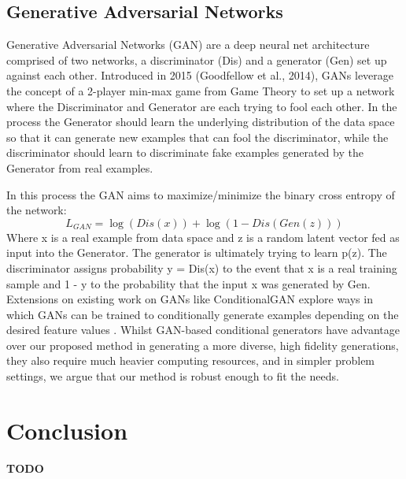 \documentclass{article}
\begin{document}
\subsection{Generative Adversarial Networks}

Generative Adversarial Networks (GAN) are a deep neural net architecture comprised of two networks, a discriminator (Dis) and a generator (Gen) set up against each other. Introduced in 2015 (Goodfellow et al., 2014), GANs leverage the concept of a 2-player min-max game from Game Theory to set up a network where the Discriminator and Generator are each trying to fool each other. In the process the Generator should learn the underlying distribution of the data space so that it can generate new examples that can fool the discriminator, while the discriminator should learn to discriminate fake examples generated by the Generator from real examples.\par
In this process the GAN aims to maximize/minimize the binary cross entropy of the network:
\begin{equation} 
L_{GAN}=\log(Dis(x))+\log(1-Dis(Gen(z)))
\end{equation}
Where x is a real example from data space and z is a random latent vector fed as input into the Generator. The generator is ultimately trying to learn p(z). The discriminator assigns probability y = Dis(x)  to the event that x is a real training sample and 1 - y to the probability that the input x was generated by Gen. Extensions on existing work on GANs like ConditionalGAN explore ways in which GANs can be trained to conditionally generate examples depending on the desired feature values \cite{Mirza}. Whilst GAN-based conditional generators have advantage over our proposed method in generating a more diverse, high fidelity generations, they also require much heavier computing resources, and in simpler problem settings, we argue that our method is robust enough to fit the needs.

\section{Conclusion}

\textbf{TODO}

\medskip



\end{document}
